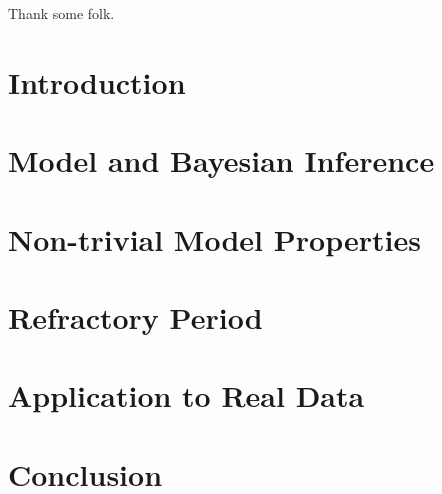 \documentclass[oneside, 12 pt]{book}
\begin{document}
\newpage


 \vspace{3cm}
 
 
 \\ \\
Thank some folk.

\tableofcontents
\listoffigures
\listoftables
\mainmatter
\pagestyle{fancy}
\chapter{Introduction}
 
 
\chapter{Model and Bayesian Inference}\label{chapter 2}
 


\chapter{Non-trivial Model Properties}\label{chapter 3}



\chapter{Refractory Period}\label{chapter 4}



\chapter{Application to Real Data}\label{chapter 5}



\chapter{Conclusion}\label{chapter 6}




 
 
\end{document}
